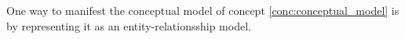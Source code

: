 \begin{tool} \label{tool:conceptual_model} 
  One way to manifest the conceptual model of concept \ref{conc:conceptual_model} is by representing it as an entity-relationsship model. \cite[p. 199-200]{benyon14}
\end{tool}
